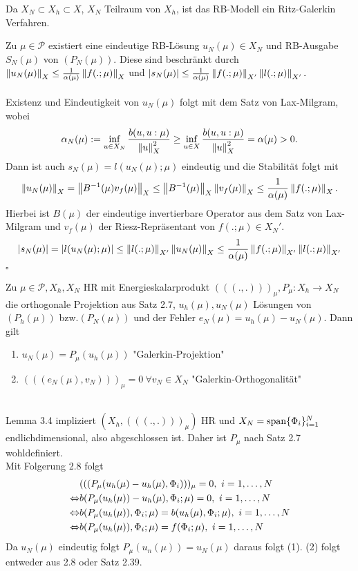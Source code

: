 Da $X_N\subset X_h\subset X$, $X_N$ Teilraum von $X_h$, ist das RB-Modell ein Ritz-Galerkin Verfahren.

Zu $\mu\in\mathcal{P}$ existiert eine eindeutige RB-Lösung $u_N(\mu)\in X_N$ und RB-Ausgabe $S_N(\mu)$ von $(P_N(\mu))$.
Diese sind beschränkt durch $\left\Vert u_N(\mu)\right\Vert_X \le \frac{1}{\alpha(\mu)} \left\Vert f(.;\mu)\right\Vert_{X}$ und $\left\vert s_N(\mu)\right\vert\le \frac{1}{\alpha(\mu)}\left\Vert f(.;\mu)\right\Vert_{X'}\left\Vert l(.;\mu)\right\Vert_{X'}.$\\

\\
Existenz und Eindeutigkeit von $u_N(\mu)$ folgt mit dem Satz von Lax-Milgram, wobei
\[
\alpha_N(\mu) := \inf\limits_{u\in X_N} \frac{b(u,u:\mu)}{\left\Vert u\right\Vert_X^2} \ge \inf\limits_{u\in X} \frac{b(u,u:\mu)}{\left\Vert u\right\Vert_X^2} = \alpha(\mu) > 0.
\]
Dann ist auch $s_N(\mu) = l(u_N(\mu);\mu)$ eindeutig und die Stabilität folgt mit
\[
\left\Vert u_N(\mu)\right\Vert_X = \left\Vert B^{-1}(\mu) v_f(\mu)\right\Vert_X \le \left\Vert B^{-1}(\mu)\right\Vert_X \left\Vert v_f(\mu)\right\Vert_X \le \frac{1}{\alpha(\mu)}\left\Vert f(.;\mu)\right\Vert_X.
\]
Hierbei ist $B(\mu)$ der eindeutige invertierbare Operator aus dem Satz von Lax-Milgram und $v_f(\mu)$ der Riesz-Repräsentant von $f(.;\mu)\in X_N'$.
\[
\left\vert s_N(\mu)\right\vert = \left\vert l(u_N(\mu);\mu)\right\vert \le \left\Vert l(.;\mu)\right\Vert_{X'}\left\Vert u_N(\mu)\right\Vert_X \le \frac{1}{\alpha(\mu)} \left\Vert f(.;\mu)\right\Vert_{X'}\left\Vert l(.;\mu)\right\Vert_{X'}
\]
\hfill $\square$

Zu $\mu\in\mathcal{P},X_h,X_N$ HR mit Energieskalarprodukt $(((.,.)))_\mu,P_\mu:X_h\to X_N$ die orthogonale Projektion aus Satz 2.7, $u_h(\mu),u_N(\mu)$ Lösungen von $(P_h(\mu))$ bzw.$(P_N(\mu))$ und der Fehler $e_N(\mu) = u_h(\mu)-u_N(\mu)$.
Dann gilt
\begin{enumerate}[(1)]
	\item $u_N(\mu) = P_\mu(u_h(\mu))$ "Galerkin-Projektion"
	\item $(((e_N(\mu),v_N)))_\mu = 0 ~\forall v_N\in X_N$ "Galerkin-Orthogonalität"
\end{enumerate}

\\
Lemma 3.4 impliziert $(X_h, (((.,.)))_\mu)$ HR und $X_N = \operatorname{span}\{\Phi_i \}_{i=1}^N$ endlichdimensional, also abgeschlossen ist. 
Daher ist $P_\mu$ nach Satz 2.7 wohldefiniert.\\
Mit Folgerung 2.8 folgt
\begin{align*}
&(((P_\mu(u_h(\mu)-u_h(\mu),\Phi_i)))_\mu = 0,~i=1, \dots ,N\\
\Leftrightarrow &b(P_\mu(u_h(\mu))-u_h(\mu),\Phi_i; \mu) = 0,~i=1, \dots ,N\\
\Leftrightarrow &b(P_\mu(u_h(\mu)),\Phi_i; \mu) = b(u_h(\mu),\Phi_i;\mu),~i=1, \dots ,N\\
\Leftrightarrow &b(P_\mu(u_h(\mu)),\Phi_i; \mu) = f(\Phi_i;\mu),~i=1, \dots ,N\\
\end{align*}
Da $u_N(\mu)$ eindeutig folgt $P_\mu(u_n(\mu)) = u_N(\mu)$ daraus folgt (1). (2) folgt entweder aus 2.8 oder Satz 2.39.

